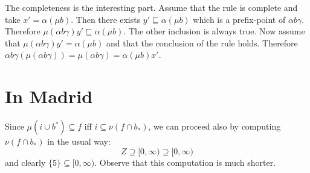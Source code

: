 \documentclass{llncs}
\begin{document}
The completeness is the interesting part. Assume that the rule is complete and take $x' = \alpha(\mu b)$. Then there exists $y'\sqsubseteq \alpha(\mu b)$ which is a prefix-point of  $\alpha b \gamma$. Therefore $\mu(\alpha b \gamma) y'\sqsubseteq  \alpha(\mu b)$. The other inclusion is always true.
Now assume that $\mu(\alpha b \gamma) y' =  \alpha(\mu b)$ and that the conclusion of the rule holds. Therefore $ \alpha b \gamma (\mu(\alpha b \gamma))  = \mu(\alpha b \gamma)  =  \alpha(\mu b) x' $.




\section{In Madrid}

Since $\mu (i \cup b^*)\subseteq f$ iff $i \subseteq \nu (f \cap b_*)$, we can proceed also by computing $\nu (f \cap b_*)$ in the usual way:
\begin{equation*}
Z \supseteq [0,\infty)  \supseteq [0,\infty) 
\end{equation*}
and clearly $\{5\} \subseteq [0,\infty)$.
Observe that this computation is much shorter. 





%
%
\end{document}
